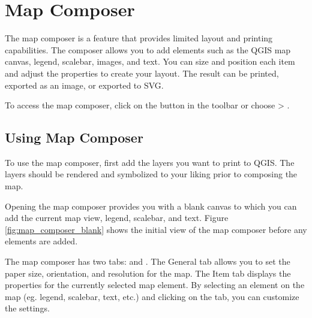 
\section{Map Composer}\label{label_mapcomposer}

\updatedisclaimer

The map composer is a feature that provides limited layout and printing
capabilities. The composer allows you to add elements such as the QGIS map
canvas, legend, scalebar, images, and text. You can size and position each item and
adjust the properties to create your layout. The result can be printed,
exported as an image, or exported to SVG.

To access the map composer, click on the 
button in the toolbar or choose  > .

\subsection{Using Map Composer}\label{label_usemapcomposer} 

To use the map composer, first add the layers you
want to print to QGIS. The layers should be rendered and symbolized to your
liking prior to composing the map. 


Opening the map composer provides you with a blank canvas to which you can add
the current map view, legend, scalebar, and text. Figure
\ref{fig:map_composer_blank} shows the initial view of the map composer before
any elements are added.

The map composer has two tabs:  and . The General tab
allows you to set the paper size, orientation, and resolution for the map.
The Item tab displays the properties for the currently selected map element.
By selecting an element on the map (eg. legend, scalebar, text, etc.) and
clicking on the  tab, you can customize the settings.

